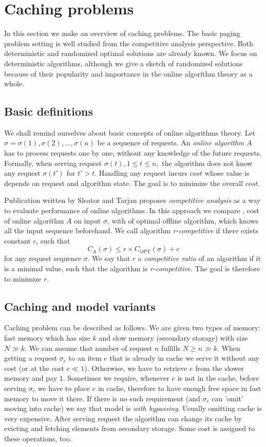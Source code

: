 \section{Caching problems}
\label{caching_problems}
In this section we make an overview of caching problems. The basic paging 
problem setting is well studied from the competitive analysis perspective. 
Both deterministic and randomized optimal solutions are already known. We focus 
on deterministic algorithms, although we give a sketch of randomized solutions 
because of their popularity and importance in the online algorithm theory as a 
whole. 
\subsection{Basic definitions}
We shall remind ourselves about basic concepts of online algorithms theory. 
Let $\sigma = \sigma(1), \sigma(2), \ldots, \sigma(n)$ be a sequence of 
requests. An \textit{online algorithm} $A$ has to process requests one by one, 
without any knowledge of the future requests. Formally, when 
serving request 
$\sigma(t), 1 \leq t \leq n,$ the algorithm does not know any request 
$\sigma(t')$ for $t'>t$. Handling any request incurs $cost$ whose value is 
depends on request and algorithm state. The goal is to minimize the overall 
$cost$.

Publication written by Sleator and Tarjan \cite{tarjan} proposes 
\textit{competitive analysis} as a way to evaluate performance of online 
algorithms. In this approach we compare , cost of online algorithm 
$A$ on input $\sigma$, with  of optimal offline algorithm, 
which knows all the input sequence beforehand. We call algorithm 
\textit{r-competitive} if there exists constant $c$, such that
$$C_{\mathrm{A}}(\sigma) \leq r \times C_{\mathrm{OPT}}(\sigma) + c$$
for any request sequence $\sigma$. We say that $r$ a \textit{competitive ratio}
of an algorithm if it is a minimal value, such that the algorithm is 
\textit{r-competitive}. The goal is therefore to minimize $r$.

\subsection{Caching and model variants}
Caching problem can be described as follows. We are given two types of memory: 
fast memory which has size $k$ and slow memory (secondary storage) with size $N 
\gg k$. We can 
assume that number of request $n$ fulfills $N \geq n \gg k$. When getting a 
request $\sigma_{e}$ to an item $e$ that is already in cache we serve it 
without any cost (or at the cost $c \ll 1$). 
Otherwise, we have to retrieve $e$ from the slower memory and pay 
$1$. Sometimes we require, whenever $e$ is not in the cache, before 
serving $\sigma_{e}$ we have to place $e$ in cache, therefore to have enough 
free space in fast memory to move it there. If there is no such requirement 
(and $\sigma_{e}$ can 'omit' moving into cache) we say that model is 
\textit{with bypassing}. Usually omitting cache is very expensive. After serving 
request the algorithm can change its cache by evicting and fetching elements 
from secondary storage. Some cost is assigned to these operations, too.

